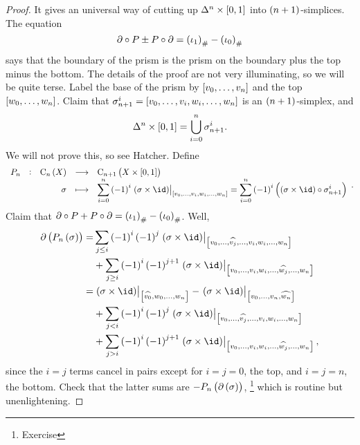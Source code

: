 \begin{proof}
It gives an universal way of cutting up $ \Delta^n \times \sbr{0, 1} $ into $ \br{n + 1} $-simplices. The equation
$$ \da \circ P \pm P \circ \da = \br{\iota_1}_\# - \br{\iota_0}_\# $$
says that the boundary of the prism is the prism on the boundary plus the top minus the bottom. The details of the proof are not very illuminating, so we will be quite terse. Label the base of the prism by $ \sbr{v_0, \dots, v_n} $ and the top $ \sbr{w_0, \dots, w_n} $. Claim that $ \sigma_{n + 1}^i = \sbr{v_0, \dots, v_i, w_i, \dots, w_n} $ is an $ \br{n + 1} $-simplex, and
$$ \Delta^n \times \sbr{0, 1} = \bigcup_{i = 0}^n \sigma_{n + 1}^i. $$
We will not prove this, so see Hatcher. Define
$$ \function[P_n]{\C_n\br{X}}{\C_{n + 1}\br{X \times \sbr{0, 1}}}{\sigma}{\sum_{i = 0}^n \br{-1}^i\eval{\br{\sigma \times \id}}_{\sbr{v_0, \dots, v_i, w_i, \dots, w_n}} = \sum_{i = 0}^n \br{-1}^i\br{\br{\sigma \times \id} \circ \sigma_{n + 1}^i}}. $$
Claim that $ \da \circ P + P \circ \da = \br{\iota_1}_\# - \br{\iota_0}_\# $. Well,
\begin{align*}
\da\br{P_n\br{\sigma}}
= & \sum_{j \le i} \br{-1}^i\br{-1}^j\eval{\br{\sigma \times \id}}_{\sbr{v_0, \dots, \widehat{v_j}, \dots, v_i, w_i, \dots, w_n}} \\
& + \sum_{j \ge i} \br{-1}^i\br{-1}^{j + 1}\eval{\br{\sigma \times \id}}_{\sbr{v_0, \dots, v_i, w_i, \dots, \widehat{w_j}, \dots, w_n}} \\
= & \eval{\br{\sigma \times \id}}_{\sbr{\widehat{v_0}, w_0, \dots, w_n}} - \eval{\br{\sigma \times \id}}_{\sbr{v_0, \dots, v_n, \widehat{w_n}}} \\
& + \sum_{j < i} \br{-1}^i\br{-1}^j\eval{\br{\sigma \times \id}}_{\sbr{v_0, \dots, \widehat{v_j}, \dots, v_i, w_i, \dots, w_n}} \\
& + \sum_{j > i} \br{-1}^i\br{-1}^{j + 1}\eval{\br{\sigma \times \id}}_{\sbr{v_0, \dots, v_i, w_i, \dots, \widehat{w_j}, \dots, w_n}},
\end{align*}
since the $ i = j $ terms cancel in pairs except for $ i = j = 0 $, the top, and $ i = j = n $, the bottom. Check that the latter sums are $ -P_n\br{\da\br{\sigma}} $, \footnote{Exercise} which is routine but unenlightening.
\end{proof}

